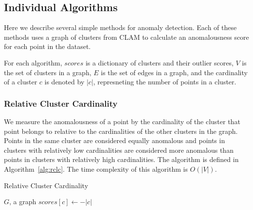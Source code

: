 \subsection{Individual Algorithms}\label{subsec:methods:individual-algorithms}

Here we describe several simple methods for anomaly detection.
Each of these methods uses a graph of clusters from CLAM to calculate an anomalousness score for each point in the dataset.

For each algorithm, $scores$ is a dictionary of clusters and their outlier scores,
$V$ is the set of clusters in a graph,
$E$ is the set of edges in a graph, and
the cardinality of a cluster $c$ is denoted by $|c|$, represneting the number of points in a cluster.

\subsubsection{Relative Cluster Cardinality}
We measure the anomalousness of a point by the cardinality of the cluster that point belongs to relative to the cardinalities of the other clusters in the graph.
Points in the same cluster are considered equally anomalous and points in clusters with relatively low cardinalities are considered more anomalous than points in clusters with relatively high cardinalities. The algorithm is defined in Algorithm~\ref{alg:rclc}. The time complexity of this algorithm is $O(|V|)$.



\begin{algorithm}[h]
    \caption{Relative Cluster Cardinality}
    \label{alg:rclc}
\begin{algorithmic}[1]
    \Require $G$, a graph
    \State $scores[c] \gets -|c|$
    \EndFor
\end{algorithmic}
\end{algorithm}

